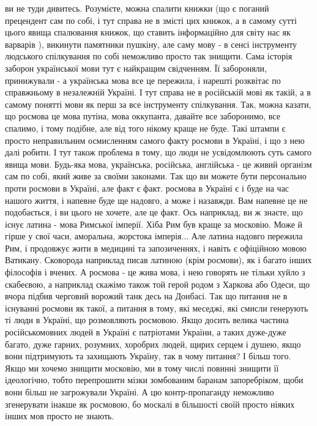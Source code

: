 ви не туди дивитесь. Розумієте, можна спалити книжки (що є поганий прецендент
сам по собі, і тут справа не в змісті цих книжок, а в самому сутті цього явища
спалювання книжок,  що ставить інформаційно для світу нас як варварів ),
викинути памятники пушкіну, але саму мову - в сенсі інструменту людського
спілкування  по собі неможливо просто так знищити. Сама історія заборон
української мови тут є найкращим свідченням. Її забороняли, принижували - а
українська мова все це пережила, і нарешті розквітає по справжньому в
незалежній Україні. І тут справа не в російській мові як такій, а в самому
понятті мови як перш за все інструменту спілкування. Так, можна казати, що
росмова це мова путіна, мова оккупанта, давайте все заборонимо, все спалимо, і
тому подібне, але від того нікому краще не буде. Такі штампи є просто
неправильним осмисленням самого факту росмови в Україні, і що з нею далі
робити. І тут також проблема в тому, що люди не усвідомлюють суть самого явища
мови. Будь-яка мова, українська, російська, англійська - це живий організм сам
по собі, який живе за своїми законами. Так що ви можете бути персонально проти
росмови в Україні, але факт є факт. росмова в Україні є і буде на час нашого
життя, і напевне буде ще надовго, а може і назавжди. Вам напевне це не
подобається, і ви цього не хочете, але це факт. Ось наприклад, ви ж знаєте, що
існує латина - мова Римської імперії. Хіба Рим був краще за московію. Може й
гірше у свої часи, аморальна, жорстока імперія... Але латина надовго пережила
Рим, і продовжує жити в медицині та запозиченнях, і навіть є офіційною мовою
Ватикану. Сковорода наприклад писав латиною (крім росмови), як і багато інших
філософів і вчених. А росмова - це жива мова, і нею говорять не тільки хуйло з
скабеєвою, а наприклад скажімо також той герой родом з Харкова або Одеси, що
вчора підбив черговий ворожий танк десь на Донбасі. Так що питання не в
існуванні росмови як такої, а питання в тому, які меседжі, які смисли генерують
ті люди в Україні, що розмовляють росмовою. Якщо досить велика частина
російськомовних людей в Україні є патріотами України, а таких дуже-дуже багато,
дуже гарних, розумних, хоробрих людей, щирих серцем і душею, якщо вони
підтримують та захищають Україну, так в чому питання? І більш того. Якщо ми
хочемо знищити московію, ми в тому числі повинні знищити її ідеологічно, тобто
перепрошити мізки зомбованим баранам запоребріком, щоби вони більш не
загрожували Україні. А цю контр-пропаганду неможливо згенерувати інакше як
росмовою, бо москалі в більшості своїй просто ніяких інших мов просто не
знають.

